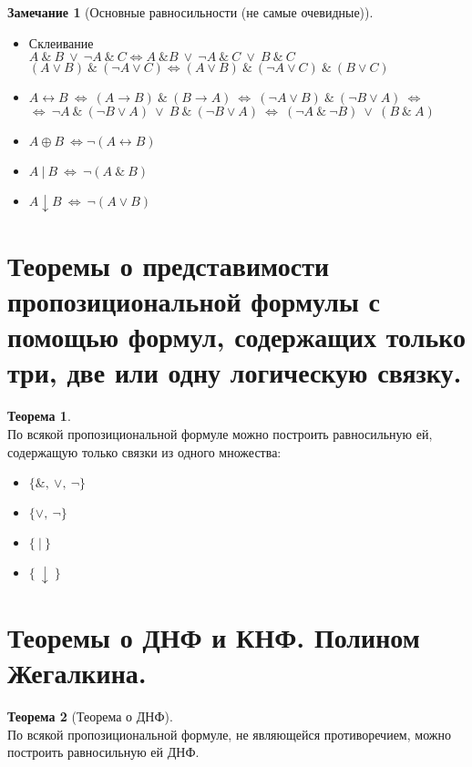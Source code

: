 \documentclass[a4paper,12pt]{article}
\theoremstyle{definition} %
\newtheorem{remark}{Замечание}[section]
\newtheorem{theorem}{Теорема}[section]
\theoremstyle{definition} %
\theoremstyle{remark} %
\begin{document}
	\begin{remark}[Основные равносильности (не самые очевидные)]\
		\begin{itemize}
			\item Склеивание \\[1ex]
			$A \ \& \ B \ \lor \ \neg A \ \& \ C \Leftrightarrow A \ \& B \ \lor \ \neg A \ \& \ C \ \lor \ B \ \& \ C$ \\[1ex]
			$(A \lor B) \ \& \ (\neg A \lor C) \Leftrightarrow (A \lor B) \ \& \ (\neg A \lor C) \ \& \ (B \lor C)$
			\item $A \leftrightarrow B \ \Leftrightarrow \ (A \rightarrow B) \ \& \ (B \rightarrow A) \ \Leftrightarrow \ (\neg A \lor B) \ \& \ (\neg B \lor A) \ \Leftrightarrow$ \\[1ex]
			$\Leftrightarrow \ \neg A \ \& \ (\neg B \lor A) \ \lor \ B \ \& \ (\neg B \lor A) \ \Leftrightarrow \ (\neg A \ \& \ \neg B) \ \lor \ (B \ \& \ A)$ 
			\item $A \oplus B \ \Leftrightarrow \neg(A \leftrightarrow B)$
			\item $A \ | \ B \ \Leftrightarrow \ \neg(A \ \& \ B)$
			\item $A \downarrow B \ \Leftrightarrow \ \neg(A \lor B) $
		\end{itemize}
	\end{remark}

\section{Теоремы о представимости пропозициональной формулы с помощью формул, содержащих только три, две или одну логическую связку.}
	\begin{theorem}\ \\[1ex]
		По всякой пропозициональной формуле можно построить равносильную ей, содержащую только связки из одного множества:
		\begin{itemize}
			\item $\{\&, \ \lor , \ \neg \}$
			\item $\{ \lor , \ \neg \}$
			\item $\{ \ | \ \}$
			\item $\{ \ \downarrow \ \}$
		\end{itemize}
	\end{theorem}

\section{Теоремы о ДНФ и КНФ. Полином Жегалкина.}
	\begin{theorem}[Теорема о ДНФ]\ \\[1ex]
		По всякой пропозициональной формуле, не являющейся противоречием, можно построить равносильную ей ДНФ.
	\end{theorem}
\end{document}
